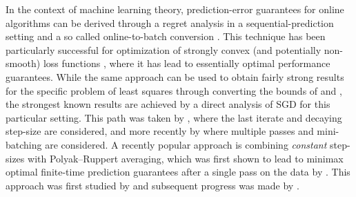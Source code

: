 \documentclass[final,12pt]{colt2018} %
\begin{document}
In the context of machine learning theory, prediction-error guarantees for online algorithms can be derived through a regret analysis in a 
sequential-prediction setting and a so called online-to-batch conversion \citep{SS12,Haz16}. This technique has been particularly 
successful for optimization of strongly convex (and potentially non-smooth) loss functions \citep{HK14,RSS12,SZ13}, where it has lead to 
essentially optimal performance guarantees. While the same approach can be used to obtain fairly strong results for the specific problem of 
least squares through converting the bounds of \cite{Vov01,AW01} and \cite{HAK07}, the strongest known results are achieved by a direct 
analysis of SGD for this particular setting.
 This path was taken by \cite{YS06,YP08, TY14}, where the 
last iterate  and decaying step-size are considered, and more recently by 
  \cite{RV15,LR17} where  multiple passes and mini-batching are considered. 
A recently popular approach is combining \emph{constant} step-sizes with Polyak--Ruppert averaging, which was first shown to lead to  
minimax optimal finite-time prediction guarantees after a single pass on the data by \citet{BM13}. This approach was first studied by 
\citet{GyW96} and subsequent progress was made by \cite{DB15,DB16,DFB16,JKKNS16,JKKNPS17,LS18}. 
\end{document}
